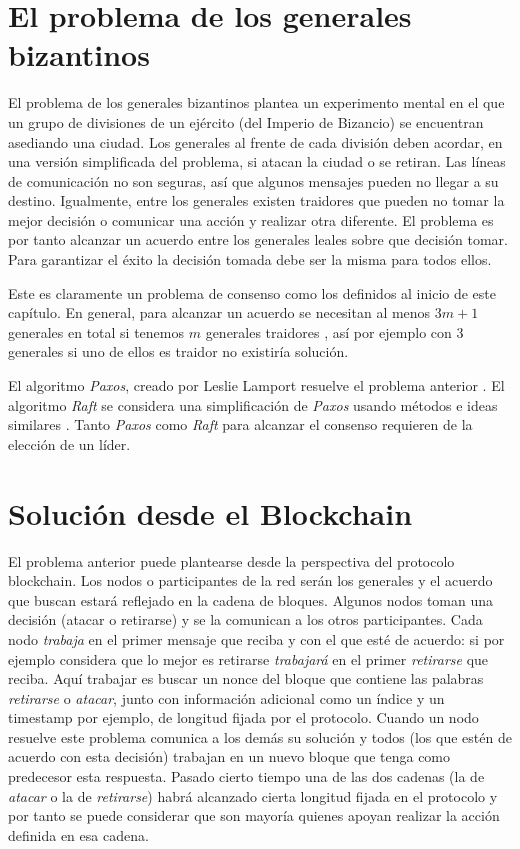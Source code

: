 \section{El problema de los generales bizantinos}
El problema de los generales bizantinos \citep{byzantine_generals} plantea un experimento mental en el que un grupo de divisiones de un ejército (del Imperio de Bizancio) se encuentran asediando una ciudad. Los generales al frente de cada división deben acordar, en una versión simplificada del problema, si atacan la ciudad o se retiran. Las líneas de comunicación no son seguras, así que algunos mensajes pueden no llegar a su destino. Igualmente, entre los generales existen traidores que pueden no tomar la mejor decisión o comunicar una acción y realizar otra diferente.
El problema es por tanto alcanzar un acuerdo entre los generales leales sobre que decisión tomar. Para garantizar el éxito la decisión tomada debe ser la misma para todos ellos.

Este es claramente un problema de consenso como los definidos al inicio de este capítulo. En general, para alcanzar un acuerdo se necesitan al menos $3m+1$ generales en total si tenemos $m$ generales traidores \citep{byzantine_generals}, así por ejemplo con 3 generales si uno de ellos es traidor no existiría solución.

El algoritmo \textit{Paxos}, creado por  Leslie Lamport resuelve el problema anterior \citep{paxos}. El algoritmo \textit{Raft} se considera una simplificación de \textit{Paxos} usando métodos e ideas similares \citep{raft}. Tanto \textit{Paxos} como \textit{Raft} para alcanzar el consenso requieren de la elección de un líder.

\section{Solución desde el Blockchain}
El problema anterior puede plantearse desde la perspectiva del protocolo blockchain. Los nodos o participantes de la red serán los generales y el acuerdo que buscan estará reflejado en la cadena de bloques. Algunos nodos toman una decisión (atacar o retirarse) y se la comunican a los otros participantes. Cada nodo \textit{trabaja} en el primer mensaje que reciba y con el que esté de acuerdo: si por ejemplo considera que lo mejor es retirarse \textit{trabajará} en el primer \textit{retirarse} que reciba. Aquí trabajar es buscar un nonce del bloque que contiene las palabras \textit{retirarse} o \textit{atacar}, junto con información adicional como un índice y un timestamp por ejemplo, de longitud fijada por el protocolo. Cuando un nodo resuelve este problema comunica a los demás su solución y todos (los que estén de acuerdo con esta decisión) trabajan en un nuevo bloque que tenga como predecesor esta respuesta. Pasado cierto tiempo una de las dos cadenas (la de \textit{atacar} o la de \textit{retirarse}) habrá alcanzado cierta longitud fijada en el protocolo y por tanto se puede considerar que son mayoría quienes apoyan realizar la acción definida en esa cadena.

